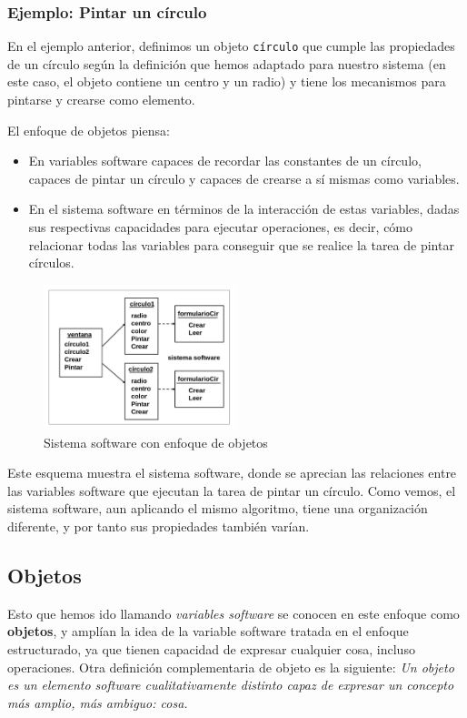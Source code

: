 \subsubsection{Ejemplo: Pintar un círculo}
\label{sec:orge1a8962} En el ejemplo anterior, definimos un objeto
\texttt{círculo} que cumple las propiedades de un círculo según la
definición que hemos adaptado para nuestro sistema (en este caso, el
objeto contiene un centro y un radio) y tiene los mecanismos para
pintarse y crearse como elemento.

El enfoque de objetos piensa:
\begin{itemize}
\item En variables software capaces de recordar las constantes de un
círculo, capaces de pintar un círculo y capaces de crearse a sí mismas
como variables.
\item En el sistema software en términos de la interacción de estas
variables, dadas sus respectivas capacidades para ejecutar
operaciones, es decir, cómo relacionar todas las variables para
conseguir que se realice la tarea de pintar círculos.
\end{itemize}

\begin{figure}[ht!]  \centering
\includegraphics[width=0.5\textwidth]{images/fig18}
  \caption{Sistema software con enfoque de objetos}
  \label{fig:18}
\end{figure}

Este esquema muestra el sistema software, donde se aprecian las
relaciones entre las variables software que ejecutan la tarea de
pintar un círculo.  Como vemos, el sistema software, aun aplicando el
mismo algoritmo, tiene una organización diferente, y por tanto sus
propiedades también varían.
\subsection{Objetos}
\label{sec:org2b984f4} Esto que hemos ido llamando \emph{variables
software} se conocen en este enfoque como \textbf{objetos}, y amplían
la idea de la variable software tratada en el enfoque estructurado, ya
que tienen capacidad de expresar cualquier cosa, incluso operaciones.
Otra definición complementaria de objeto es la siguiente: \emph{Un
objeto es un elemento software cualitativamente distinto capaz de
expresar un concepto más amplio, más ambiguo: cosa.}

